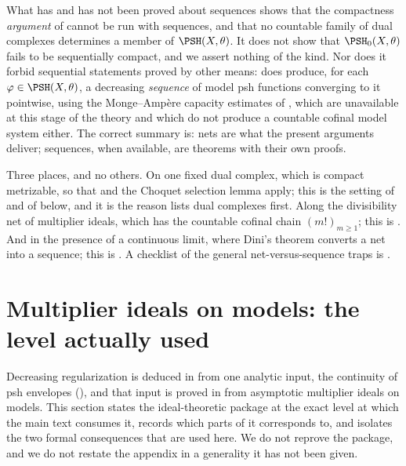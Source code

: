 \begin{warning}{What has and has not been proved about sequences}
 shows that the compactness
\emph{argument} of  cannot be run with
sequences, and that no countable family of dual complexes determines a
member of $\PSH(X,\theta)$.  It does not show that
$\PSH_0(X,\theta)$ fails to be sequentially compact, and we assert
nothing of the kind.  Nor does it forbid sequential statements proved by
other means:  does produce, for each
$\varphi\in\PSH(X,\theta)$, a decreasing \emph{sequence} of model psh
functions converging to it pointwise, using the Monge--Amp\`ere capacity
estimates of , which are unavailable at this stage
of the theory and which do not produce a countable cofinal model system
either.  The correct summary is: nets are what the present arguments
deliver; sequences, when available, are theorems with their own proofs.
\end{warning}

\begin{remark}
\label{rem:ch22-legitimate-sequences}
Three places, and no others.  On one fixed dual complex, which is compact
metrizable, so that  and the Choquet selection
lemma  apply; this is the setting of
 and of
 below, and it is the reason
 lists dual complexes first.  Along the
divisibility net of multiplier ideals, which has the countable cofinal chain
$(m!)_{m\geq1}$; this is .  And in the
presence of a continuous limit, where Dini's theorem converts a net into a
sequence; this is .  A
checklist of the general net-versus-sequence traps is
.
\end{remark}

\section{Multiplier ideals on models: the level actually used}
\label{sec:ch22-multiplier}

Decreasing regularization is deduced in
 from one analytic input, the continuity of
psh envelopes (), and that input is proved
in  from asymptotic multiplier ideals on models.
This section states the ideal-theoretic package at the exact level at which
the main text consumes it, records which parts of
 it corresponds to, and isolates the two formal
consequences that are used here.  We do not reprove the package, and we do
not restate the appendix in a generality it has not been given.

